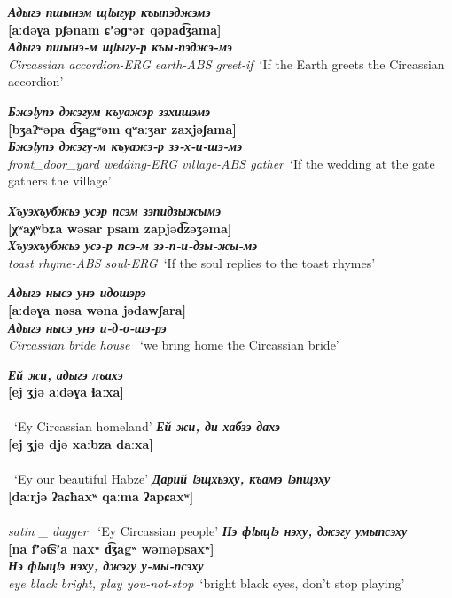 \documentclass[a4paper,12pt]{book}
\newcommand{\1}[1]{\textbf{\emph{#1}}} %
\newcommand{\2}[1]{\textbf{[#1]}} %
\newcommand{\3}[1]{\fontsize{11pt}{0cm}\textbf{\emph{#1}}} %
\newcommand{\4}[1]{\fontsize{10pt}{0cm}\emph{#1}}	%
\newcommand{\5}[1]{\textbf{/#1/}} %
\newcommand{\6}[1]{\textbf{[#1]}} %
\newcommand{\7}[1]{\fontsize{12pt}{0cm}\emph{#1}} %
\newcommand{\8}[1]{\fontsize{12pt}{0cm}`#1'} %
\newcommand{\9}[1]{\fontsize{12pt}{0cm}(lit. `#1')} %
\begin{document}
\begin{exe}
\ex
\1{Адыгэ пшынэм щlыгур къыпэджэмэ}\\
\2{aːdəɣa pʃənam ɕʼəɡʷər qəpad͡ʒama}\\
\3{Адыгэ пшынэ-м щlыгу-р къы-пэджэ-мэ}\\
\4{Circassian accordion-ERG earth-ABS greet-if}\
\trans \8{If the Earth greets the Circassian accordion}

\ex
\1{Бжэlупэ джэгум къуажэр зэхишэмэ}\\
\2{bʒaʔʷəpa d͡ʒagʷəm qʷaːʒar zaxjəʃama}\\
\3{Бжэlупэ джэгу-м къуажэ-р зэ-х-и-шэ-мэ}\\
\4{front\_door\_yard wedding-ERG village-ABS gather}\
\trans \8{If the wedding at the gate gathers the village}


\ex
\1{Хъуэхъубжьэ усэр псэм зэпидзыжымэ}\\
\2{χʷaχʷbʑa wəsar psam zapjəd͡zəʒəma}\\
\3{Хъуэхъубжьэ усэ-р псэ-м зэ-п-и-дзы-жы-мэ}\\
\4{toast rhyme-ABS soul-ERG}\
\trans \8{If the soul replies to the toast rhymes}


\ex
\1{Адыгэ нысэ унэ идошэрэ}\\
\2{aːdəɣa nəsa wəna jədawʃara}\\
\3{Адыгэ нысэ унэ и-д-о-шэ-рэ}\\
\4{Circassian bride house }\
\trans \8{we bring home the Circassian bride}

\end{exe}


\begin{exe}
\ex
\1{Ей жи, адыгэ лъахэ}\\
\2{ej ʒjə aːdəɣa ɬaːxa}\\
\3{}\\
\4{}\
\trans \8{Ey Circassian homeland}
\ex
\1{Ей жи, ди хабзэ дахэ}\\
\2{ej ʒjə djə xaːbza daːxa}\\
\3{}\\
\4{}\
\trans \8{Ey our beautiful Habze}
\ex
\1{Дарий lэщхьэху, къамэ lэпщэху}\\
\2{daːrjə ʔaɕħaxʷ qaːma ʔapɕaxʷ}\\
\3{}\\
\4{satin _ dagger }\
\trans \8{Ey Circassian people}
\ex
\1{Нэ фlыцlэ нэху, джэгу умыпсэху}\\
\2{na fʼət͡sʼa naxʷ d͡ʒagʷ wəməpsaxʷ}\\
\3{Нэ фlыцlэ нэху, джэгу у-мы-псэху}\\
\4{eye black bright, play you-not-stop}\
\trans \8{bright black eyes, don't stop playing}

\end{exe}
\end{document}
